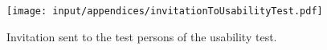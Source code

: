 
\begin{figure}%
	\begin{center}
	\texttt{[image: input/appendices/invitationToUsabilityTest.pdf]}
	\end{center}
\caption{Invitation sent to the test persons of the usability test.}%
\label{appendice:usabilitytest}%
\end{figure}